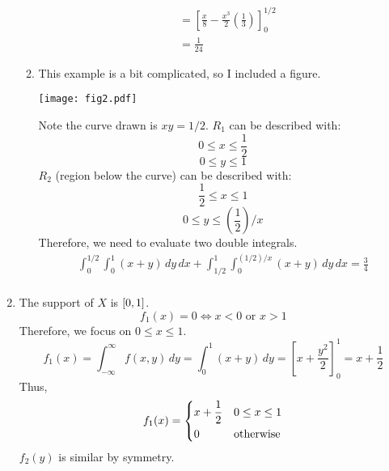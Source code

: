 \begin{Example}{}{}
\begin{enumerate}[label=(\roman*)]
\begin{enumerate}[label=(\alph*)]
\begin{align*}
                             & =\left[ \frac{x}{8} -\frac{x^3}{2} \left( \frac{1}{3}  \right) \right]_0^{1/2} \\
                             & =\frac{1}{24}
                        \end{align*}
                  \item This example is a bit complicated,
                        so I included a figure.
                        \begin{center}
                            \texttt{[image: fig2.pdf]}
                        \end{center}
                        Note the curve drawn is $ xy=1/2 $.
                        $ R_1 $ can be described with:
                        \[ 0\le x\le \frac{1}{2}   \]
                        \[ 0\le y\le 1 \]
                        $ R_2 $ (region below the curve) can be described with:
                        \[ \frac{1}{2} \le x\le 1 \]
                        \[ 0\le y\le \left( \frac{1}{2} \right)/x  \]
                        Therefore, we need to evaluate two double integrals.
                        \begin{align*}
                            \int_{0}^{1/2} \int_{0}^{1} (x+y)\, d{y} \, d{x}
                            +\int_{1/2}^{1} \int_{0}^{(1/2)/x} (x+y)\, d{y} \, d{x}=\frac{3}{4} \\
                        \end{align*}
              \end{enumerate}
        \item The support of $ X $ is $ \interval{0}{1} $.
              \[ f_1(x)=0\iff x<0\text{ or } x>1 \]
              Therefore, we focus on $ 0\le x\le 1 $.
              \[ f_1(x)=\int_{-\infty}^{\infty} f(x,y)\, d{y}
                  =\int_{0}^{1} (x+y)\, d{y}=\left[ x+\frac{y^2}{2} \right]_0^1
                  =x+\frac{1}{2} \]
              Thus,
              \[ f_1(x)=
                  \begin{dcases}
                      x+\frac{1}{2} & 0\le x\le 1      \\
                      0             & \text{otherwise}
                  \end{dcases} \]
              $ f_2(y) $ is similar by symmetry.
    \end{enumerate}
\end{Example}
